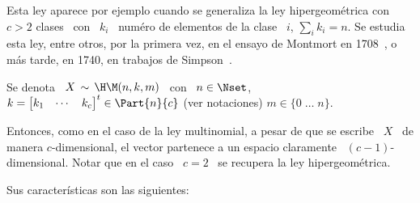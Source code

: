 \label{Sssec:MP:HipergeometricaMultivariada}

Esta ley aparece por ejemplo cuando  se generaliza la ley hipergeom\'etrica con $c
> 2$ clases \ con \ $k_i$ \ num\'ero de elementos de la clase \ $i$, $\sum_i k_i
= n$.   Se estudia esta ley,  entre otros, por la  primera vez, en  el ensayo de
Montmort  en  1708~\cite{Mon13},  o  m\'as   tarde,  en  1740,  en  trabajos  de
Simpson~\cite{Sim40, Hal90, DavEdw01}.

Se denota \ $X \, \sim \, \H\M(n,k,m)$ \ con \ $\displaystyle n \in \Nset$, \quad
$k = \begin{bmatrix} k_1 & \cdots & k_c\end{bmatrix}^t \in \Part{n}{c}$ (ver notaciones)
  \quad $m \in  \{ 0 \;  \ldots \;
n\}$.

Entonces, como en el caso de la ley multinomial, a pesar de que se escribe \ $X$
\  de manera  $c$-dimensional, el  vector partenece  a un  espacio  claramente \
$(c-1)$-dimensional.  Notar que  en el  caso \  $c  = 2$  \ se  recupera la  ley
hipergeom\'etrica.

Sus caracter\'isticas son las siguientes:


